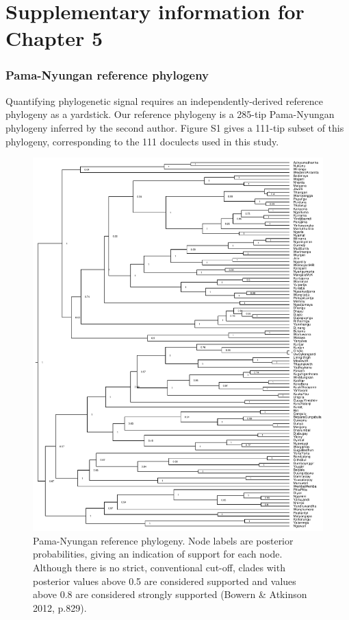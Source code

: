 \chapter{Supplementary information for Chapter 5}

\hypertarget{pama-nyungan-reference-phylogeny}{%
\subsection{Pama-Nyungan reference
phylogeny}\label{-pama-nyungan-reference-phylogeny}}

Quantifying phylogenetic signal requires an independently-derived
reference phylogeny as a yardstick. Our reference phylogeny is a 285-tip
Pama-Nyungan phylogeny inferred by the second author. Figure S1 gives a
111-tip subset of this phylogeny, corresponding to the 111 doculects
used in this study.

\begin{figure}
\includegraphics[width=1\linewidth]{Appendix-B/fig/PN_beast_pruned} \caption{Pama-Nyungan reference phylogeny. Node labels are posterior probabilities, giving an indication of support for each node. Although there is no strict, conventional cut-off, clades with posterior values above 0.5 are considered supported and values above 0.8 are considered strongly supported (Bowern \& Atkinson 2012, p.829).}\label{fig:plot-ref-tree2}
\end{figure}

